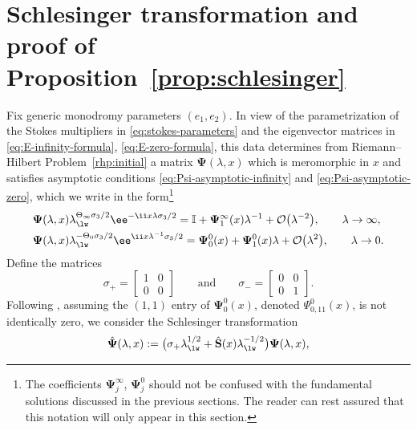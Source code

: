 \section{Schlesinger transformation and proof of Proposition~\ref{prop:schlesinger}}\label{sec:schlesinger}

Fix generic monodromy parameters $(e_1, e_2)$. In view of the parametrization of the Stokes multipliers in \eqref{eq:stokes-parameters} and the eigenvector matrices in \eqref{eq:E-infinity-formula}, \eqref{eq:E-zero-formula}, this data determines from Riemann--Hilbert Problem~\ref{rhp:initial} a matrix $\mathbf{\Psi}(\lambda, x)$ which is meromorphic in $x$ and satisfies asymptotic conditions \eqref{eq:Psi-asymptotic-infinity} and \eqref{eq:Psi-asymptotic-zero}, which we write in the form\footnote{The coefficients $\mathbf{\Psi}_j^{\infty}$, $\mathbf{\Psi}_j^{0}$ should not be confused with the fundamental solutions discussed in the previous sections. The reader can rest assured that this notation will only appear in this section.}
\begin{align*}
&\mathbf{\Psi}(\lambda, x) \lambda_{\lw}^{\Theta_\infty \sigma_3 /2} \ee^{-\ii x \lambda \sigma_3 /2} = \mathbb{I} + \mathbf{\Psi}_1^{\infty}(x) \lambda^{-1} + \mathcal{O}\big(\lambda^{-2}\big) , \qquad \lambda \to \infty, \\
&\mathbf{\Psi}(\lambda, x) \lambda_{\lw}^{-\Theta_0 \sigma_3 /2} \ee^{\ii x \lambda^{-1} \sigma_3 /2} = \mathbf{\Psi}_0^{0}(x) + \mathbf{\Psi}_1^{0}(x) \lambda + \mathcal{O}\big(\lambda^{2}\big) , \qquad \lambda \to 0.
\end{align*}
Define the matrices
\begin{equation*}%
\sigma_+ = \begin{bmatrix} 1 & 0 \\ 0 & 0 \end{bmatrix} \qquad \text{and} \qquad \sigma_- = \begin{bmatrix} 0 & 0 \\ 0 & 1 \end{bmatrix}.
\end{equation*}
Following \cite{BMS18}, assuming the $(1, 1)$ entry of $\mathbf{\Psi}_0^{0}(x)$, denoted ${\Psi}_{0, 11}^{0}(x)$, is not identically zero, we consider the Schlesinger transformation
\begin{equation*}
\hat{\mathbf{\Psi}}(\lambda, x) := \big( \sigma_+ \lambda_{\lw}^{1/2} + \hat{\mathbf{S}}(x) \lambda_{\lw}^{-1/2}\big) \mathbf{\Psi}(\lambda, x),
\end{equation*}
